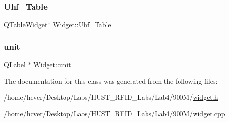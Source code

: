 \subsubsection{\texorpdfstring{Uhf\_Table}{Uhf\_Table}}
{\footnotesize\ttfamily Q\+Table\+Widget$\ast$ Widget\+::\+Uhf\+\_\+\+Table\hspace{0.3cm}{\ttfamily [private]}}

\mbox{\label{class_widget_a147ff0275f5ebb2d20f198228e150b81}} 
\subsubsection{\texorpdfstring{unit}{unit}}
{\footnotesize\ttfamily Q\+Label $\ast$ Widget\+::unit\hspace{0.3cm}{\ttfamily [private]}}



The documentation for this class was generated from the following files\+:\begin{DoxyCompactItemize}
\item 
/home/hover/\+Desktop/\+Labs/\+H\+U\+S\+T\+\_\+\+R\+F\+I\+D\+\_\+\+Labs/\+Lab4/900\+M/\mbox{\hyperlink{widget_8h}{widget.\+h}}\item 
/home/hover/\+Desktop/\+Labs/\+H\+U\+S\+T\+\_\+\+R\+F\+I\+D\+\_\+\+Labs/\+Lab4/900\+M/\mbox{\hyperlink{widget_8cpp}{widget.\+cpp}}\end{DoxyCompactItemize}

